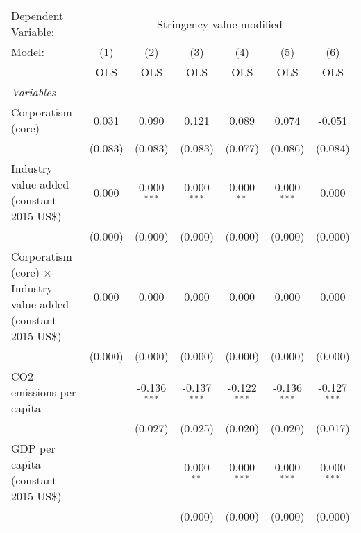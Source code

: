 
\begingroup
\centering
\begin{tabular}{lcccccc}
   \toprule
   Dependent Variable: & \multicolumn{6}{c}{Stringency value modified}\\
   Model:                                                                  & (1)     & (2)            & (3)            & (4)            & (5)            & (6)\\  
                                                                           &  OLS    & OLS            & OLS            & OLS            & OLS            & OLS\\  
   \midrule
   \emph{Variables}\\
   Corporatism (core)                                                      & 0.031   & 0.090          & 0.121          & 0.089          & 0.074          & -0.051\\   
                                                                           & (0.083) & (0.083)        & (0.083)        & (0.077)        & (0.086)        & (0.084)\\   
   Industry value added (constant 2015 US\$)                               & 0.000   & 0.000$^{***}$  & 0.000$^{***}$  & 0.000$^{**}$   & 0.000$^{***}$  & 0.000\\   
                                                                           & (0.000) & (0.000)        & (0.000)        & (0.000)        & (0.000)        & (0.000)\\   
   Corporatism (core) $\times$ Industry value added (constant 2015 US\$)   & 0.000   & 0.000          & 0.000          & 0.000          & 0.000          & 0.000\\   
                                                                           & (0.000) & (0.000)        & (0.000)        & (0.000)        & (0.000)        & (0.000)\\   
   CO2 emissions per capita                                                &         & -0.136$^{***}$ & -0.137$^{***}$ & -0.122$^{***}$ & -0.136$^{***}$ & -0.127$^{***}$\\   
                                                                           &         & (0.027)        & (0.025)        & (0.020)        & (0.020)        & (0.017)\\   
   GDP per capita (constant 2015 US\$)                                     &         &                & 0.000$^{**}$   & 0.000$^{***}$  & 0.000$^{***}$  & 0.000$^{***}$\\   
                                                                           &         &                & (0.000)        & (0.000)        & (0.000)        & (0.000)\\   

\end{tabular}
